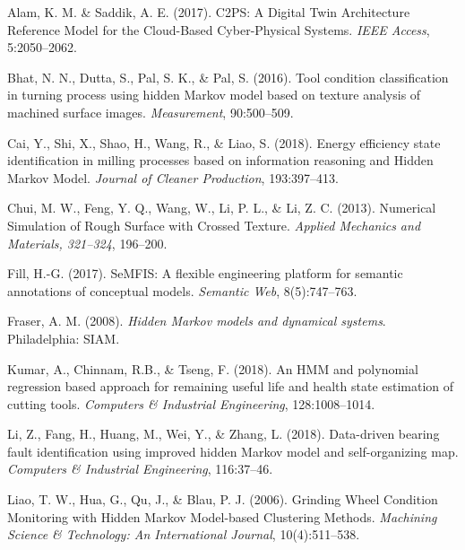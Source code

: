 \documentclass{CUP-JNL-DCE}
\begin{document}
\begin{Backmatter}

%

\begin{thebibliography}{}

Alam, K. M. {\&} Saddik, A. E. (2017). C2PS: A Digital Twin Architecture
Reference Model for the Cloud-Based Cyber-Physical Systems. \textit{IEEE Access}, 5:2050--2062.

Bhat, N. N., Dutta, S., Pal, S. K., {\&} Pal, S. (2016). Tool condition
classification in turning process using hidden Markov model based on texture
analysis of machined surface images. \textit{Measurement}, 90:500--509.

Cai, Y., Shi, X., Shao, H., Wang, R., {\&} Liao, S. (2018). Energy
efficiency state identification in milling processes based on information
reasoning and Hidden Markov Model. \textit{Journal of Cleaner Production}, 193:397--413.

Chui, M. W., Feng, Y. Q., Wang, W., Li, P. L., {\&} Li, Z. C. (2013).
Numerical Simulation of Rough Surface with Crossed Texture. \textit{Applied Mechanics and Materials, 321--324}, 196--200.

Fill, H.-G. (2017). SeMFIS: A flexible engineering platform for semantic
annotations of conceptual models. \textit{Semantic Web}, 8(5):747--763.

Fraser, A. M. (2008). \textit{Hidden Markov models and dynamical systems}. Philadelphia: SIAM.

Kumar, A., Chinnam, R.B., {\&} Tseng, F. (2018). An HMM and polynomial
regression based approach for remaining useful life and health state
estimation of cutting tools. \textit{Computers {\&} Industrial Engineering}, 128:1008--1014.


Li, Z., Fang, H., Huang, M., Wei, Y., {\&} Zhang, L. (2018). Data-driven
bearing fault identification using improved hidden Markov model and
self-organizing map. \textit{Computers {\&} Industrial Engineering}, 116:37--46.

Liao, T. W., Hua, G., Qu, J., {\&} Blau, P. J. (2006). Grinding Wheel
Condition Monitoring with Hidden Markov Model-based Clustering Methods.
\textit{Machining Science {\&} Technology: An International Journal}, 10(4):511--538.


\end{thebibliography}
\end{Backmatter}
\end{document}
